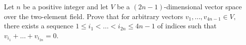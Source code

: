 Let \(n\) be a positive integer and let \(V\) be a \((2n-1)\)-dimensional vector space over the two-element field. Prove that for arbitrary vectors \(v_1,\dots,v_{4n-1} \in V,\) there exists a sequence \(1\leq i_1<\dots<i_{2n}\leq 4n-1\) of indices such that \(v_{i_1}+\dots+v_{i_{2n}}=0.\)